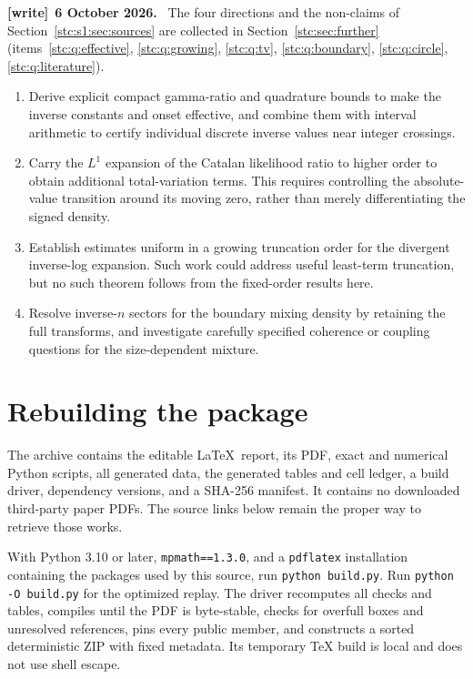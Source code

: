 \documentclass[11pt,letterpaper]{article}
\numberwithin{equation}{section}
\theoremstyle{remark}\newtheorem{remark}[theorem]{Remark}
\newenvironment{writenote}[1][]{\par\smallskip\begingroup\small
 \noindent\textbf{[write]}\if\relax\detokenize{#1}\relax\else~\textbf{#1.}\fi\ }%
 {\par\endgroup\smallskip}
\begin{document}
\begin{writenote}[6 October 2026]
The four directions and the non-claims of Section~\ref{stc:s1:sec:sources} are collected in Section~\ref{stc:sec:further} (items~\ref{stc:q:effective}, \ref{stc:q:growing}, \ref{stc:q:tv}, \ref{stc:q:boundary}, \ref{stc:q:circle}, \ref{stc:q:literature}).
\end{writenote}
\begin{enumerate}
\item Derive explicit compact gamma-ratio and quadrature bounds to make the inverse constants and onset effective, and combine them with interval arithmetic to certify individual discrete inverse values near integer crossings.
\item Carry the $L^1$ expansion of the Catalan likelihood ratio to higher order to obtain additional total-variation terms. This requires controlling the absolute-value transition around its moving zero, rather than merely differentiating the signed density.
\item Establish estimates uniform in a growing truncation order for the divergent inverse-log expansion. Such work could address useful least-term truncation, but no such theorem follows from the fixed-order results here.
\item Resolve inverse-$n$ sectors for the boundary mixing density by retaining the full transforms, and investigate carefully specified coherence or coupling questions for the size-dependent mixture.
\end{enumerate}

\section{Rebuilding the package}\label{stc:s1:sec:rebuild}
The archive contains the editable \LaTeX\ report, its PDF, exact and numerical Python scripts, all generated data, the generated tables and cell ledger, a build driver, dependency versions, and a SHA-256 manifest. It contains no downloaded third-party paper PDFs. The source links below remain the proper way to retrieve those works.

With Python 3.10 or later, \texttt{mpmath==1.3.0}, and a \texttt{pdflatex} installation containing the packages used by this source, run \texttt{python build.py}. Run \texttt{python -O build.py} for the optimized replay. The driver recomputes all checks and tables, compiles until the PDF is byte-stable, checks for overfull boxes and unresolved references, pins every public member, and constructs a sorted deterministic ZIP with fixed metadata. Its temporary TeX build is local and does not use shell escape.
\end{document}
